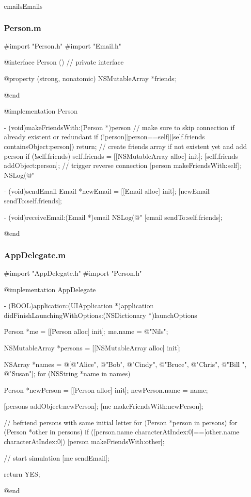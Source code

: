 \documentclass[parskip=half, final]{scrreprt}
\begin{document}
\begin{lsg}
\begin{lsgitem}{emails}{Emails}
\subsubsection{Person.m}
\begin{objclst}
#import "Person.h"
#import "Email.h"

@interface Person () // private interface

@property (strong, nonatomic) NSMutableArray *friends;

@end

@implementation Person

- (void)makeFriendsWith:(Person *)person {
    // make sure to skip connection if already existent or redundant
    if (!person||person==self||[self.friends containsObject:person]) return;
    // create friends array if not existent yet and add person
    if (!self.friends) self.friends = [[NSMutableArray alloc] init];
    [self.friends addObject:person];
    // trigger reverse connection
    [person makeFriendsWith:self];
    NSLog(@"%
}

- (void)sendEmail {
    Email *newEmail = [[Email alloc] init];
    [newEmail sendTo:self.friends];
}

- (void)receiveEmail:(Email *)email {
    NSLog(@"%
    [email sendTo:self.friends];
}

@end
\end{objclst}

\subsubsection{AppDelegate.m}
\begin{objclst}
#import "AppDelegate.h"
#import "Person.h"

@implementation AppDelegate

- (BOOL)application:(UIApplication *)application didFinishLaunchingWithOptions:(NSDictionary *)launchOptions {

    Person *me = [[Person alloc] init];
    me.name = @"Nils";

    NSMutableArray *persons = [[NSMutableArray alloc] init];

    NSArray *names = @[@"Alice", @"Bob", @"Cindy", @"Bruce", @"Chris", @"Bill ", @"Susan"];
    for (NSString *name in names) {
        Person *newPerson = [[Person alloc] init];
        newPerson.name = name;

        [persons addObject:newPerson];
        [me makeFriendsWith:newPerson];
    }

    // befriend persons with same initial letter
    for (Person *person in persons) {
        for (Person *other in persons) {
            if ([person.name characterAtIndex:0]==[other.name characterAtIndex:0]) {
                [person makeFriendsWith:other];
            }
        }
    }

    // start simulation
    [me sendEmail];

    return YES;
}

@end
\end{objclst}

\end{lsgitem}\end{lsg}
\end{document}
